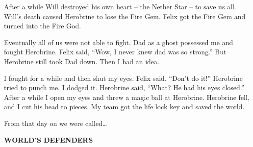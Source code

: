 \documentclass[12pt,oneside]{krantz}
\begin{document}
After a while Will destroyed his own heart -- the Nether Star -- to save
us all. Will's death caused Herobrine to lose the Fire Gem. Felix got
the Fire Gem and turned into the Fire God.

Eventually all of us were not able to fight. Dad as a ghost possessed me
and fought Herobrine. Felix said, ``Wow, I never knew dad was so
strong.'' But Herobrine still took Dad down. Then I had an idea.

I fought for a while and then shut my eyes. Felix said, ``Don't do it!''
Herobrine tried to punch me. I dodged it. Herobrine said, ``What? He had
his eyes closed.'' After a while I open my eyes and threw a magic ball
at Herobrine. Herobrine fell, and I cut his head to pieces. My team got
the life lock key and saved the world.

From that day on we were called\ldots{}

\textbf{WORLD'S DEFENDERS}
\end{document}
